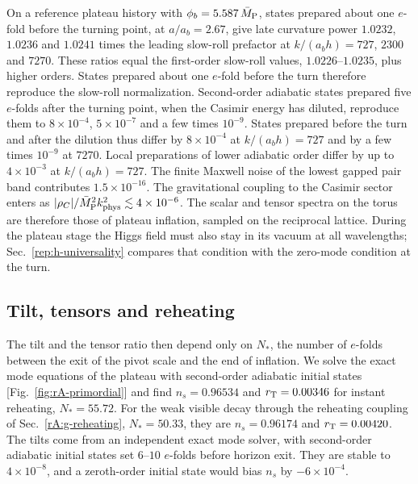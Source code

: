 On a reference plateau history with $\phi_b=5.587\,\bar M_{\mathrm{P}}$, states prepared about one $e$-fold before the turning point, at $a/a_b=2.67$, give late curvature power $1.0232$, $1.0236$ and $1.0241$ times the leading slow-roll prefactor at $k/(a_bh)=727$, $2300$ and $7270$. %
These ratios equal the first-order slow-roll values, $1.0226$--$1.0235$, plus higher orders. %
States prepared about one $e$-fold before the turn therefore reproduce the slow-roll normalization.
Second-order adiabatic states prepared five $e$-folds after the turning point, when the Casimir energy has diluted, reproduce them to $8\times10^{-4}$, $5\times10^{-7}$ and a few times $10^{-9}$. %
States prepared before the turn and after the dilution thus differ by $8\times10^{-4}$ at $k/(a_bh)=727$ and by a few times $10^{-9}$ at $7270$. %
Local preparations of lower adiabatic order differ by up to $4\times10^{-3}$ at $k/(a_bh)=727$. %
The finite Maxwell noise of the lowest gapped pair band contributes $1.5\times10^{-16}$. %
The gravitational coupling to the Casimir sector enters as $|\rho_C|/\bar M_{\mathrm{P}}^2k_{\rm phys}^2\lesssim4\times10^{-6}$. %
The scalar and tensor spectra on the torus are therefore those of plateau inflation, sampled on the reciprocal lattice.
During the plateau stage the Higgs field must also stay in its vacuum at all wavelengths; Sec.~\ref{rep:h-universality} compares that condition with the zero-mode condition at the turn.

\subsection{Tilt, tensors and reheating}
\label{rA:c-tilt}

The tilt and the tensor ratio then depend only on $N_*$, the number of $e$-folds between the exit of the pivot scale and the end of inflation.
We solve the exact mode equations of the plateau with second-order adiabatic initial states [Fig.~\ref{fig:rA-primordial}] and find $n_s=0.96534$ and $r_{\mathrm{T}}=0.00346$ for instant reheating, $N_*=55.72$. %
For the weak visible decay through the reheating coupling of Sec.~\ref{rA:g-reheating}, $N_*=50.33$, they are $n_s=0.96174$ and $r_{\mathrm{T}}=0.00420$. %
The tilts come from an independent exact mode solver, with second-order adiabatic initial states set $6$--$10$ $e$-folds before horizon exit. %
They are stable to $4\times10^{-8}$, and a zeroth-order initial state would bias $n_s$ by $-6\times10^{-4}$. %

